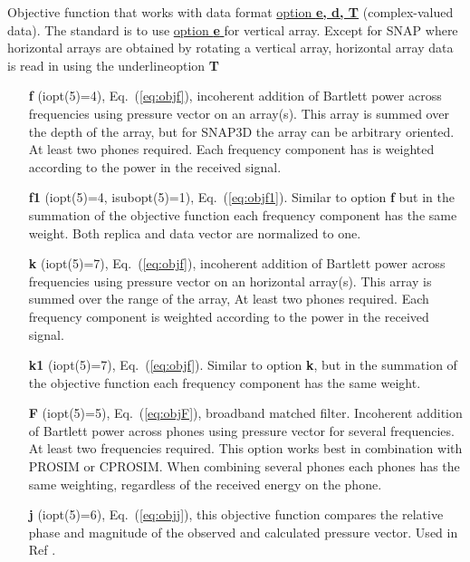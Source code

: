 \documentclass{saclantc}
\begin{document}
Objective function that works with data format \underline{option {\bf
e, d, T}}
(complex-valued data). The standard is to use \underline{option {\bf e
}} for vertical array. 
Except for {\sf SNAP} where horizontal arrays are obtained by
rotating a vertical array, horizontal array data is read in using the
underline{option {\bf T }}
\vspace{-0.6cm}
\begin{itemize}
    \item[{\bf f}] (iopt(5)=4), Eq.\ (\ref{eq:objf}), incoherent addition of Bartlett power
across frequencies using pressure vector on an array(s).
This array is summed over the depth of the array, but for {\sf SNAP3D } the array can be arbitrary oriented. 
At least two phones required.
Each frequency component has is weighted according to the power in the
received signal.
\vspace{-0.3cm}
    \item[{\bf f1}] (iopt(5)=4, isubopt(5)=1), Eq.\ (\ref{eq:objf1}). Similar to option {\bf f} but in the summation of the objective function 
each frequency component has the same weight.  Both replica and data
vector are normalized to one.
 \vspace{-0.3cm}
    \item[{\bf k}] (iopt(5)=7), Eq.\ (\ref{eq:objf}), incoherent addition of Bartlett power
across frequencies using pressure vector on an horizontal array(s).
This array is summed over the range of the  array,
At least two phones required.
Each frequency component is weighted according to the power in the
received signal.
 \vspace{-0.3cm}
    \item[{\bf k1}] (iopt(5)=7), Eq.\ (\ref{eq:objf}). Similar to option {\bf k}, but in the summation of the objective function 
each frequency component has the same weight.
 \vspace{-0.3cm}
    \item[{\bf F}] (iopt(5)=5), Eq.\ (\ref{eq:objF}),   broadband matched filter.
Incoherent addition of Bartlett power
across phones using pressure vector for several frequencies.
At least two frequencies required.
This option works best in combination with {\sf PROSIM} or {\sf CPROSIM}.
When combining several phones each phones has the same weighting, regardless of the received energy on the phone.
\vspace{-0.3cm}
    \item[{\bf j}] (iopt(5)=6), Eq.\ (\ref{eq:objj}), this objective function compares the
    relative phase
and magnitude of the observed and calculated pressure vector. Used in Ref 
\cite{gerstoft:ieee00}.
\vspace{+0.3cm}
\end{itemize}
\end{document}
